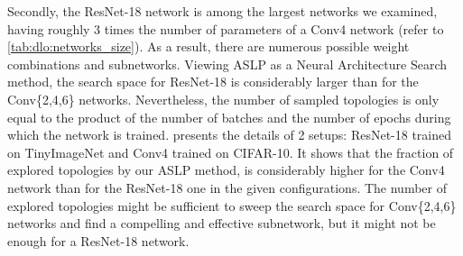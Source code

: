 Secondly, the ResNet-18 network is among the largest networks we examined,
having roughly 3 times the number of parameters of a Conv4 network (refer to
\cref{tab:dlo:networks_size}). As a result, there are numerous possible weight
combinations and subnetworks. Viewing \ac{ASLP} as a Neural Architecture Search
method, the search space for ResNet-18 is considerably larger than for the
Conv\{2,4,6\} networks. Nevertheless, the number of sampled topologies is only
equal to the product of the number of batches and the number of epochs during
which the network is trained.  presents
the details of 2 setups: ResNet-18 trained on TinyImageNet and Conv4 trained on
CIFAR-10. It shows that the fraction of explored topologies by our \ac{ASLP}
method, is considerably higher for the Conv4 network than for the ResNet-18 one
in the given configurations. The number of explored topologies might be
sufficient to sweep the search space for Conv\{2,4,6\} networks and find a
compelling and effective subnetwork, but it might not be enough for a ResNet-18
network.\\

